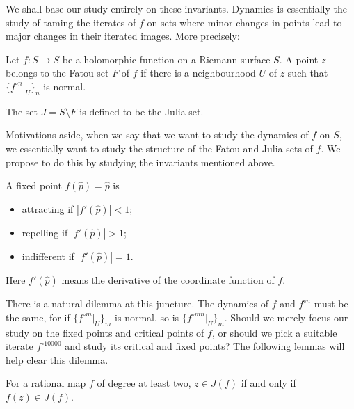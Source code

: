 \documentclass[11pt,a4paper]{article}
\begin{document}
We shall base our study entirely on these invariants. Dynamics is essentially the study of taming the iterates of $f$ on sets where minor changes in points lead to major changes in their iterated images. More precisely:
\setcounter{definition}{0}\begin{definition}
Let $f\colon S\to S$ be a holomorphic function on a Riemann surface $S$. A point $z$ belongs to the Fatou set $F$ of $f$ if there is a neighbourhood $U$ of $z$ such that $\{f^{\circ n}|_U\}_n$ is normal.
\end{definition}
\setcounter{definition}{1}\begin{definition}
The set $J=S\setminus F$ is defined to be the Julia set.
\end{definition}
Motivations aside, when we say that we want to study the dynamics of $f$ on $S$, we essentially want to study the structure of the Fatou and Julia sets of $f$. We propose to do this by studying the invariants mentioned above.
\setcounter{definition}{2}\begin{definition}
A fixed point $f(\widehat p)=\widehat p$ is
\begin{itemize}
\item attracting if $|f'(\widehat p)|<1$;
\item repelling if $|f'(\widehat p)|>1$;
\item indifferent if $|f'(\widehat p)|=1$.
\end{itemize}
Here $f'(\widehat p)$ means the derivative of the coordinate function of $f$.
\end{definition}
There is a natural dilemma at this juncture. The dynamics of $f$ and $f^{\circ n}$ must be the same, for if $\{f^{\circ m}|_U\}_m$ is normal, so is $\{f^{\circ mn}|_U\}_m$. Should we merely focus our study on the fixed points and critical points of $f$, or should we pick a suitable iterate $f^{\circ10000}$ and study its critical and fixed points? The following lemmas will help clear this dilemma.
\setcounter{theorem}{0}\begin{lemma}\label{cd1:invariance}
For a rational map $f$ of degree at least two, $z\in J(f)$ if and only if $f(z)\in J(f)$.
\end{lemma}
\end{document}
